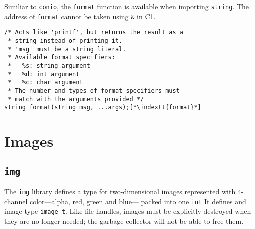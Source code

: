 \documentclass[11pt]{article}
\makeatletter
\newcommand{\indextt}[1]{\index{#1@\texttt{#1}}}
\makeatother
\begin{document}
Similiar to \lstinline'conio', the \lstinline'format' function
is available when importing \lstinline'string'.
The address of \lstinline'format' cannot be taken using \lstinline'&' in C1.
\begin{lstlisting}
/* Acts like 'printf', but returns the result as a
 * string instead of printing it.
 * 'msg' must be a string literal.
 * Available format specifiers:
 *   %s: string argument
 *   %d: int argument
 *   %c: char argument
 * The number and types of format specifiers must
 * match with the arguments provided */
string format(string msg, ...args);[*\indextt{format}*]
\end{lstlisting}

\clearpage

\section{Images}

\subsection{\tt img}

The \lstinline'img' library defines a type for two-dimensional images
represented with 4-channel color---alpha, red, green and blue---
packed into one \lstinline'int'  It defines and image type \lstinline'image_t'.
Like file handles, images must be explicitly destroyed when they
are no longer needed; the garbage collector will not be able to
free them.
\end{document}
